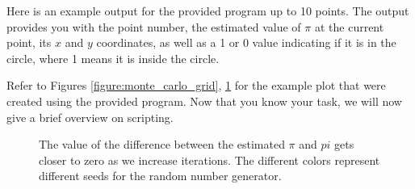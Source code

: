 
Here is an example output for the provided program up to 10 points.
The output provides you with the point number, the estimated value
of $\pi$ at the current point, its $x$ and $y$ coordinates, as well
as a 1 or 0 value indicating if it is in the circle, where 1 means
it is inside the circle.

Refer to Figures  \ref{figure:monte_carlo_grid}, \ref{figure:monte_carlo}
for the example plot that were created using the provided program.
Now that you know your task, we will now give a brief overview on
\Bash{} scripting.

\begin{figure}[htb]
  \centering
  
  \caption{\label{figure:monte_carlo}
    The value of the difference between the estimated $\pi$ and
    $pi$ gets closer to zero as we increase iterations. The different
    colors represent different seeds for the random number generator.}
\end{figure}
